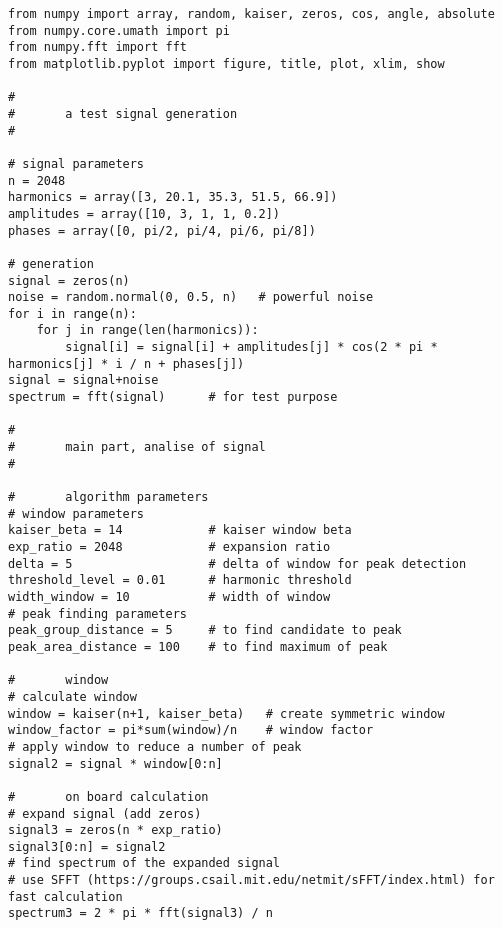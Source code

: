 \begin{lstlisting} 
from numpy import array, random, kaiser, zeros, cos, angle, absolute
from numpy.core.umath import pi
from numpy.fft import fft
from matplotlib.pyplot import figure, title, plot, xlim, show

#
#       a test signal generation
#

# signal parameters
n = 2048
harmonics = array([3, 20.1, 35.3, 51.5, 66.9])
amplitudes = array([10, 3, 1, 1, 0.2])
phases = array([0, pi/2, pi/4, pi/6, pi/8])

# generation
signal = zeros(n)
noise = random.normal(0, 0.5, n)   # powerful noise
for i in range(n):
    for j in range(len(harmonics)):
        signal[i] = signal[i] + amplitudes[j] * cos(2 * pi * harmonics[j] * i / n + phases[j])
signal = signal+noise
spectrum = fft(signal)      # for test purpose

#
#       main part, analise of signal
#

#       algorithm parameters
# window parameters
kaiser_beta = 14            # kaiser window beta
exp_ratio = 2048            # expansion ratio
delta = 5                   # delta of window for peak detection
threshold_level = 0.01      # harmonic threshold
width_window = 10           # width of window
# peak finding parameters
peak_group_distance = 5     # to find candidate to peak
peak_area_distance = 100    # to find maximum of peak

#       window
# calculate window
window = kaiser(n+1, kaiser_beta)   # create symmetric window
window_factor = pi*sum(window)/n    # window factor
# apply window to reduce a number of peak
signal2 = signal * window[0:n]

#       on board calculation
# expand signal (add zeros)
signal3 = zeros(n * exp_ratio)
signal3[0:n] = signal2
# find spectrum of the expanded signal
# use SFFT (https://groups.csail.mit.edu/netmit/sFFT/index.html) for fast calculation
spectrum3 = 2 * pi * fft(signal3) / n


\end{lstlisting}
